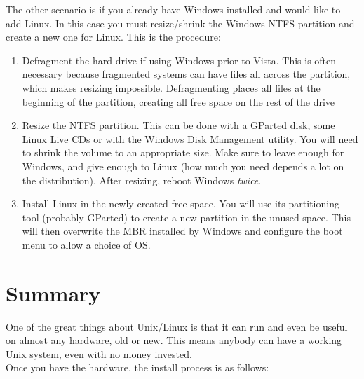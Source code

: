 The other scenario is if you already have Windows installed and would like to add Linux.  In this case you must resize/shrink the Windows NTFS partition and create a new one for Linux.  This is the procedure:

\begin{enumerate}
\item
Defragment the hard drive if using Windows prior to Vista.  This is often necessary because fragmented systems can have files all across the partition, which makes resizing impossible.  Defragmenting places all files at the beginning of the partition, creating all free space on the rest of the drive

\item
Resize the NTFS partition.  This can be done with a GParted disk, some Linux Live CDs or with the Windows Disk Management utility.  You will need to shrink the volume to an appropriate size.  Make sure to leave enough for Windows, and give enough to Linux (how much you need depends a lot on the distribution).  After resizing, reboot Windows \textit{twice}.

\item
Install Linux in the newly created free space.  You will use its partitioning tool (probably GParted) to create a new partition in the unused space.  This will then overwrite the MBR installed by Windows and configure the boot menu to allow a choice of OS.
\end{enumerate}

\section*{Summary}

One of the great things about Unix/Linux is that it can run and even be useful on almost any hardware, old or new.  This means anybody can have a working Unix system, even with no money invested.\\

Once you have the hardware, the install process is as follows:\\


